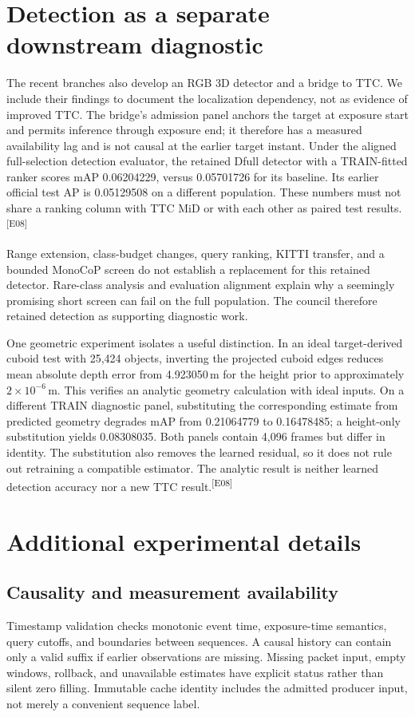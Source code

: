 \documentclass[twocolumn,letterpaper]{article}
\newcommand{\evid}[1]{\textsuperscript{\textsf{[#1]}}}
\begin{document}
\clearpage
\appendix
\section{Detection as a separate downstream diagnostic}
\label{app:detection}
The recent branches also develop an RGB 3D detector and a bridge to TTC. We include their findings to document the localization dependency, not as evidence of improved TTC. The bridge's admission panel anchors the target at exposure start and permits inference through exposure end; it therefore has a measured availability lag and is not causal at the earlier target instant. Under the aligned full-selection detection evaluator, the retained Dfull detector with a TRAIN-fitted ranker scores mAP 0.06204229, versus 0.05701726 for its baseline. Its earlier official test AP is 0.05129508 on a different population. These numbers must not share a ranking column with TTC MiD or with each other as paired test results.\evid{E08}

Range extension, class-budget changes, query ranking, KITTI transfer, and a bounded MonoCoP screen do not establish a replacement for this retained detector. Rare-class analysis and evaluation alignment explain why a seemingly promising short screen can fail on the full population. The council therefore retained detection as supporting diagnostic work.

One geometric experiment isolates a useful distinction. In an ideal target-derived cuboid test with 25,424 objects, inverting the projected cuboid edges reduces mean absolute depth error from 4.923050\,m for the height prior to approximately $2\times10^{-6}$\,m. This verifies an analytic geometry calculation with ideal inputs. On a different TRAIN diagnostic panel, substituting the corresponding estimate from predicted geometry degrades mAP from 0.21064779 to 0.16478485; a height-only substitution yields 0.08308035. Both panels contain 4,096 frames but differ in identity. The substitution also removes the learned residual, so it does not rule out retraining a compatible estimator. The analytic result is neither learned detection accuracy nor a new TTC result.\evid{E08}

\section{Additional experimental details}
\subsection{Causality and measurement availability}
Timestamp validation checks monotonic event time, exposure-time semantics, query cutoffs, and boundaries between sequences. A causal history can contain only a valid suffix if earlier observations are missing. Missing packet input, empty windows, rollback, and unavailable estimates have explicit status rather than silent zero filling. Immutable cache identity includes the admitted producer input, not merely a convenient sequence label.
\end{document}
